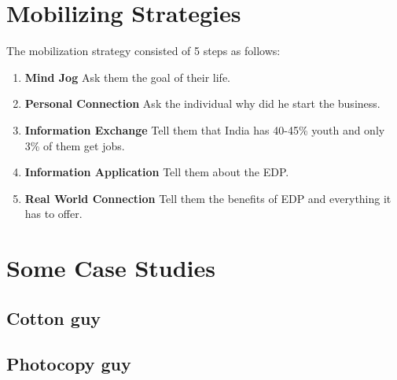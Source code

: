 

\section{Mobilizing Strategies}
The mobilization strategy consisted of 5 steps as follows:
\begin{enumerate}
	\item \textbf{Mind Jog} \newline
		Ask them the goal of their life.
	\item \textbf{Personal Connection} \newline
		Ask the individual why did he start the business.
	\item \textbf{Information Exchange} \newline
		Tell them that India has 40-45\% youth and only 3\% of them get jobs. 
	\item \textbf{Information Application} \newline
		Tell them about the EDP.
	\item \textbf{Real World Connection} \newline
		Tell them the benefits of EDP and everything it has to offer.
\end{enumerate}

\section{Some Case Studies}

\subsection{Cotton guy}

\subsection{Photocopy guy}



